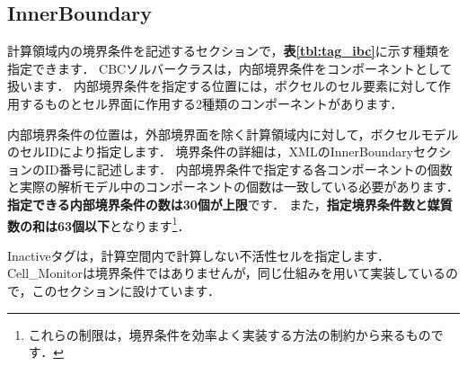 %
\pagebreak
\hypertarget{tgt:innerboundary}{\subsection{InnerBoundary}}

計算領域内の境界条件を記述するセクションで，\textbf{表\ref{tbl:tag_ibc}}に示す種類を指定できます．
CBCソルバークラスは，内部境界条件をコンポーネントとして扱います．
内部境界条件を指定する位置には，ボクセルのセル要素に対して作用するものとセル界面に作用する2種類のコンポーネントがあります．

内部境界条件の位置は，外部境界面を除く計算領域内に対して，ボクセルモデルのセルIDにより指定します．
境界条件の詳細は，XMLのInnerBoundaryセクションのID番号に記述します．
内部境界条件で指定する各コンポーネントの個数と実際の解析モデル中のコンポーネントの個数は一致している必要があります．
\textbf{指定できる内部境界条件の数は30個が上限}です．
また，\textbf{指定境界条件数と媒質数の和は63個以下}となります\footnote{これらの制限は，境界条件を効率よく実装する方法の制約から来るものです．}．

Inactiveタグは，計算空間内で計算しない不活性セルを指定します．
Cell\_Monitorは境界条件ではありませんが，同じ仕組みを用いて実装しているので，このセクションに設けています．




